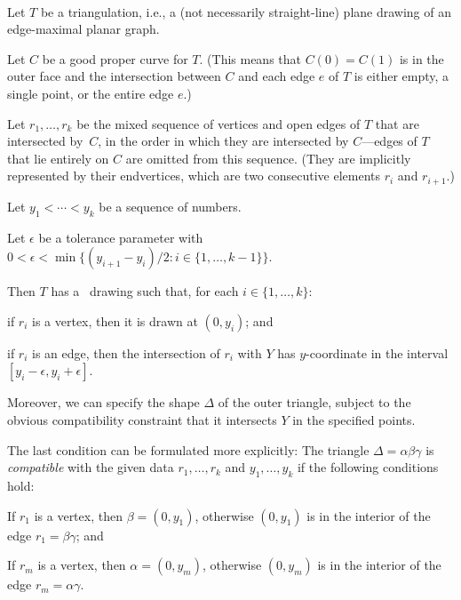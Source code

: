 \begin{thm}\ %
  \begin{compactitem}
    \item Let $T$ be a triangulation, i.e.,
      a \textup(not necessarily straight-line\textup) plane drawing of an edge-maximal
      planar graph.
    \item Let $C$ be a good proper curve for $T$. \textup(This means that $C(0)=C(1)$
      is in the outer face and the intersection between $C$ and each edge
      $e$ of $T$ is either empty, a single point, or the entire edge $e$.\textup)
     \item Let $r_1,\ldots,r_k$ be the mixed sequence of vertices and open edges of $T$ that are intersected by~$C$, in the order in which they are intersected by $C$---edges of $T$ that lie entirely on $C$ are omitted from this sequence. \textup(They are implicitly represented by their endvertices, which are two consecutive elements $r_i$ and $r_{i+1}$.\textup)
	\item Let $y_1<\cdots<y_k$ be a sequence of numbers.
                  
       \item Let $\epsilon$ be a tolerance parameter with $0<\epsilon<\min\{(y_{i+1}-y_i)/2:i\in\{1,\ldots,k-1\}\}$.
\end{compactitem}
Then
        $T$
        has a \Fary\ drawing such that,
	for each $i\in\{1,\ldots,k\}$: 
	\begin{compactitem}%
		\item if $r_i$ is a vertex, then it is drawn at $(0,y_i)$; and
		\item if $r_i$ is an edge, then the intersection of $r_i$ with $Y$ has $y$-coordinate in the interval $[y_i-\epsilon,y_i+\epsilon]$.
\end{compactitem}

Moreover, we can specify the shape $\Delta$ of the outer triangle,
subject to the
obvious compatibility constraint that it intersects $Y$ in the specified points.
                
\end{thm}
The last condition can be formulated more explicitly:
The triangle $\Delta=\alpha\beta\gamma$ is \emph{compatible} with the
given data $r_1,\ldots,r_k$ and $y_1,\ldots,y_k$ if the following conditions hold:
\begin{compactitem}
	\item If $r_1$ is a vertex, then $\beta=(0,y_1)$, otherwise $(0, y_1)$ is in the interior of the edge $r_1=\beta\gamma$; and
	\item If $r_m$ is a vertex, then $\alpha=(0,y_m)$, otherwise $(0,y_m)$ is in the interior
	of the edge $r_m=\alpha\gamma$.
\end{compactitem}

